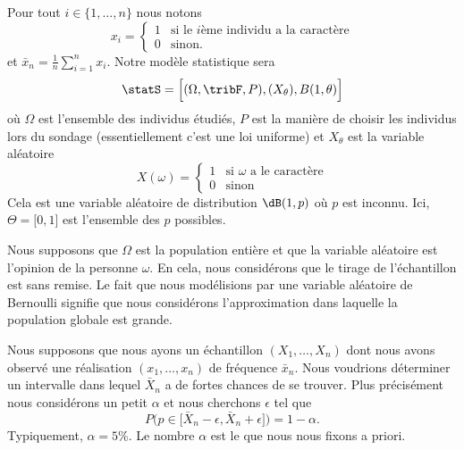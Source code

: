 Pour tout \( i\in\{ 1,\ldots, n \}\) nous notons
\begin{equation}
    x_i=\begin{cases}
        1    &   \text{si le } i\text{ème individu a la caractère}\\
        0    &    \text{sinon}.
    \end{cases}
\end{equation}
et \( \bar x_n=\frac{1}{ n }\sum_{i=1}^n x_i\). Notre modèle statistique sera
\begin{equation}
    \statS=\Big[ (\Omega,\tribF,P),(X_{\theta}),B(1,\theta) \Big]
\end{equation}
où \( \Omega\) est l'ensemble des individus étudiés, \( P\) est la manière de choisir les individus lors du sondage (essentiellement c'est une loi uniforme) et \( X_{\theta}\) est la variable aléatoire
\begin{equation}
    X(\omega)=\begin{cases}
        1    &   \text{si } \omega\text{ a le caractère}\\
        0    &    \text{sinon}
    \end{cases}
\end{equation}
Cela est une variable aléatoire de distribution \( \dB(1,p)\) où \( p\) est inconnu. Ici, \( \Theta=\mathopen[ 0 , 1 \mathclose]\) est l'ensemble des \( p\) possibles.

\begin{remark}
    Nous supposons que \( \Omega\) est la population entière et que la variable aléatoire est l'opinion de la personne \( \omega\). En cela, nous considérons que le tirage de l'échantillon est sans remise. Le fait que nous modélisions par une variable aléatoire de Bernoulli signifie que nous considérons l'approximation dans laquelle la population globale est grande.
\end{remark}

Nous supposons que nous ayons un échantillon \( (X_1,\ldots,X_n)\) dont nous avons observé une réalisation \( (x_1,\ldots,x_n)\) de fréquence \( \bar x_n\). Nous voudrions déterminer un intervalle dans lequel \( \bar X_n\) a de fortes chances de se trouver. Plus précisément nous considérons un petit \( \alpha\) et nous cherchons \( \epsilon\) tel que
\begin{equation}
    P\big( p\in\mathopen[ \bar X_n-\epsilon , \bar X_n+\epsilon \mathclose] \big)=1-\alpha.
\end{equation}
Typiquement, \( \alpha=5\%\). Le nombre \( \alpha\) est le  que nous nous fixons a priori.

